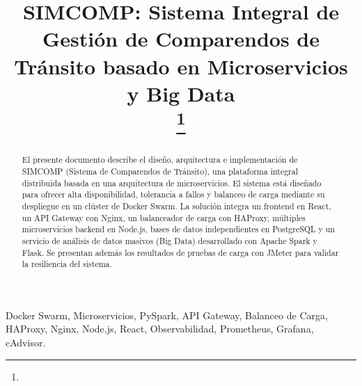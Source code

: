 \documentclass[conference]{IEEEtran}
\begin{document}
\title{SIMCOMP: Sistema Integral de Gestión de Comparendos de Tránsito basado en Microservicios y Big Data\\
{\footnotesize \textsuperscript{}}
\thanks{}
}

\author{
\and
{}
}

\maketitle

\begin{abstract}
El presente documento describe el diseño, arquitectura e implementación de SIMCOMP (Sistema de Comparendos de Tránsito), una plataforma integral distribuida basada en una arquitectura de microservicios. El sistema está diseñado para ofrecer alta disponibilidad, tolerancia a fallos y balanceo de carga mediante su despliegue en un clúster de Docker Swarm. La solución integra un frontend en React, un API Gateway con Nginx, un balanceador de carga con HAProxy, múltiples microservicios backend en Node.js, bases de datos independientes en PostgreSQL y un servicio de análisis de datos masivos (Big Data) desarrollado con Apache Spark y Flask. Se presentan además los resultados de pruebas de carga con JMeter para validar la resiliencia del sistema.
\end{abstract}

\begin{IEEEkeywords}
Docker Swarm, Microservicios, PySpark, API Gateway, Balanceo de Carga, HAProxy, Nginx, Node.js, React, Observabilidad, Prometheus, Grafana, cAdvisor.
\end{IEEEkeywords}
\end{document}
